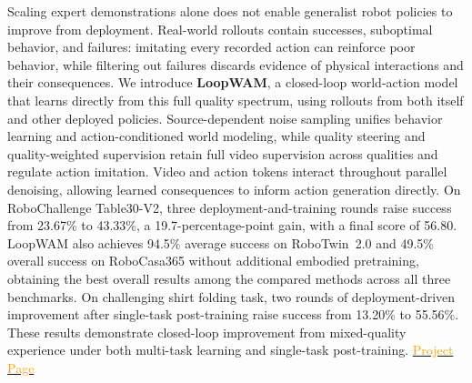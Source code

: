 
Scaling expert demonstrations alone does not enable generalist robot policies to improve from deployment.
Real-world rollouts contain successes, suboptimal behavior, and failures: imitating every recorded action can reinforce poor behavior, while filtering out failures discards evidence of physical interactions and their consequences.
We introduce \textbf{LoopWAM}, a closed-loop world-action model that learns directly from this full quality spectrum, using rollouts from both itself and other deployed policies.
Source-dependent noise sampling unifies behavior learning and action-conditioned world modeling, while quality steering and quality-weighted supervision retain full video supervision across qualities and regulate action imitation.
Video and action tokens interact throughout parallel denoising, allowing learned consequences to inform action generation directly.
On RoboChallenge Table30-V2, three deployment-and-training rounds raise success from 23.67\% to 43.33\%, a 19.7-percentage-point gain, with a final score of 56.80.
LoopWAM also achieves 94.5\% average success on RoboTwin~2.0 and 49.5\% overall success on RoboCasa365 without additional embodied pretraining, obtaining the best overall results among the compared methods across all three benchmarks.
On challenging shirt folding task, two rounds of deployment-driven improvement after single-task post-training raise success from 13.20\% to 55.56\%.
These results demonstrate closed-loop improvement from mixed-quality experience under both multi-task learning and single-task post-training. 
\href{https://loop-wam.github.io/}{\textcolor{orange}{Project Page}}